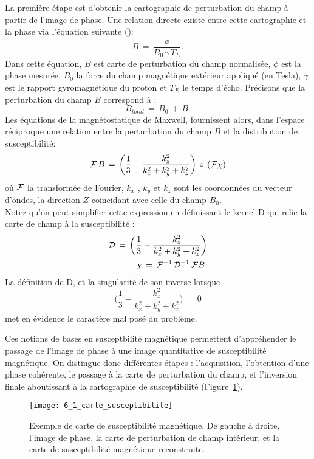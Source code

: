 La première étape est d’obtenir la cartographie de perturbation du champ à partir de l’image
de phase. Une relation directe existe entre cette cartographie et la phase via l’équation suivante (\cite{Bilgic2012}):
\begin{equation}
\label{eq:champ_phase}
B\,=\,\frac{\phi}{B_0\,\gamma\,T_E}.
\end{equation}
Dans cette équation, $B$ est carte de perturbation du champ normalisée, $\phi$ est la phase
mesurée, $B_0 $ la force du champ magnétique extérieur appliqué (en Tesla), $\gamma$ est le rapport
gyromagnétique du proton et $T_E$ le temps d’écho. Précisons que la perturbation du champ $B$
correspond à :
\begin{equation}
B_{total}\,=\,B_0\,+\,B.
\end{equation}
Les équations de la magnétostatique de Maxwell, fournissent alors, dans l’espace réciproque
une relation entre la perturbation du champ $B $ et la distribution de susceptibilité:
\begin{equation}
{\cal F}\,B\,=\,\biggl(\frac{1}{3}-\frac{k_z^2}{k_x^2+k_y^2+k_z^2}\biggr)\,\circ\,({\cal F}\chi )
\end{equation}
où ${\cal F}$ la transformée de Fourier, $k_x$ , $k_y$ et $k_z$ sont les coordonnées du vecteur d’ondes, la direction $Z$
coincidant avec celle du champ $B_0$.\\
Notez qu’on peut simplifier cette expression en définissant le kernel D qui relie la carte de champ à la
susceptibilité :
\begin{eqnarray}
{\cal D}\,=\,\biggl(\frac{1}{3}-\frac{k_z^2}{k_x^2+k_y^2+k_z^2}\biggr)\\
\chi\,=\,{\cal F}^{-1}\,{\cal D}^{-1}\,{\cal F} B.
\end{eqnarray}
La définition de D, et la singularité de son inverse lorsque
\begin{equation}
\biggl(\frac{1}{3}-\frac{k_z^2}{k_x^2+k_y^2+k_z^2}\biggr)\,=\,0
\end{equation}
met en évidence le caractère mal posé du problème.

Ces notions de bases en susceptbilité magnétique permettent d’appréhender le passage de
l’image de phase à une image quantitative de susceptibilité magnétique. On distingue donc différentes
étapes : l’acquisition, l’obtention d’une phase cohérente, le passage à la carte de perturbation du
champ, et l’inversion finale aboutissant à la cartographie de susceptibilité (Figure~\ref{fig:6_1_carte_susceptibilite}).
\begin{figure}[!t]
\centering
\texttt{[image: 6\_1\_carte\_susceptibilite]}
\caption{Exemple de carte de susceptibilité magnétique. De gauche à droite, l'image de phase, la carte de perturbation
de champ intérieur, et la carte de susceptibilité magnétique reconstruite.}
\label{fig:6_1_carte_susceptibilite}	
\end{figure}
